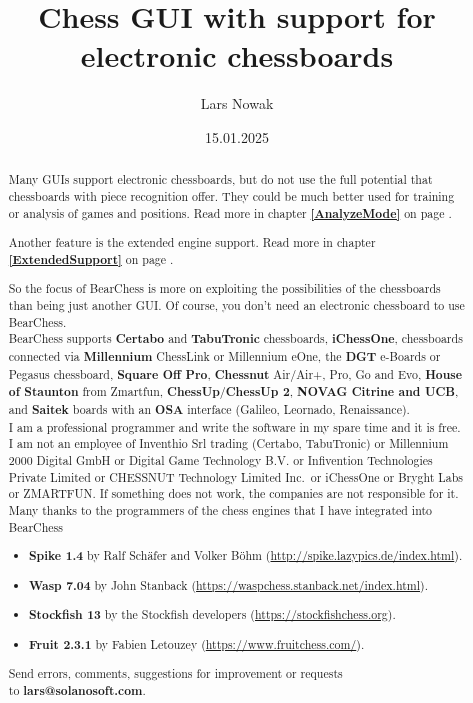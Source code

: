 \documentclass[11pt,a4paper]{article}
\title{Chess GUI with support for electronic chessboards}
\author{Lars Nowak}
\date{15.01.2025}
\begin{document}
	\maketitle
	
	\begin{abstract}
		
		Many GUIs support electronic chessboards, but do not use the full potential that chessboards with piece recognition offer. They could be much better used for training or analysis of games and positions. Read more in chapter \textbf{\ref{AnalyzeMode}  } on page \pageref{AnalyzeMode}.
		
		Another feature is the extended engine support. Read more in chapter \textbf{\ref{ExtendedSupport}  } on page \pageref{ExtendedSupport}.
		
		So the focus of BearChess is more on exploiting the possibilities of the chessboards than being just another GUI. Of course, you don't need an electronic chessboard to use BearChess.\\
		
		BearChess supports \textbf{Certabo} and \textbf{TabuTronic} chessboards, \textbf{iChessOne}, chessboards connected via \textbf{Millennium} ChessLink or Millennium eOne, the \textbf{DGT} e-Boards or Pegasus chessboard, \textbf{Square Off Pro}, \textbf{Chessnut} Air/Air+, Pro, Go and Evo,
		\textbf{House of Staunton} from Zmartfun, \textbf{ChessUp}/\textbf{ChessUp 2}, \textbf{NOVAG Citrine and UCB}, and \textbf{Saitek} boards with an \textbf{OSA} interface (Galileo, Leornado, Renaissance).\\
		
		I am a professional programmer and write the software in my spare time and it is free. I am not an employee of Inventhio Srl trading (Certabo, TabuTronic) or Millennium 2000 Digital GmbH or Digital Game Technology B.V. or Infivention Technologies Private Limited or CHESSNUT Technology Limited Inc.\ or iChessOne or Bryght Labs or ZMARTFUN. If something does not work, the companies are not responsible for it.\\
		
        Many thanks to the programmers of the chess engines that I have integrated into BearChess
	 	\begin{itemize}
	 	  \item \textbf{Spike 1.4} by Ralf Schäfer and Volker Böhm (\url{http://spike.lazypics.de/index.html}).
	 	  \item \textbf{Wasp 7.04} by John Stanback (\url{https://waspchess.stanback.net/index.html}).
	 	  \item \textbf{Stockfish 13} by the Stockfish developers (\url{https://stockfishchess.org}).        
	 	  \item \textbf{Fruit 2.3.1} by Fabien Letouzey (\url{https://www.fruitchess.com/}).                
  	    \end{itemize}	
		
		Send errors, comments, suggestions for improvement or requests\\to \textbf{lars@solanosoft.com}.
		
	\end{abstract}
	
\end{document}
